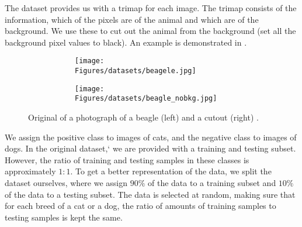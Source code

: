 The dataset provides us with a trimap for each image. The trimap consists of the information, which of the pixels are of the animal and which are of the background. We use these to cut out the animal from the background (set all the background pixel values to black). An example is demonstrated in .
\begin{figure}[!ht]
    \centering
    \begin{subfigure}{0.55\textwidth}
        \begin{subfigure}[t]{0.40\textwidth}
            \texttt{[image: Figures/datasets/beagele.jpg]}
            \label{fig:original:example}
        \end{subfigure}\hfill
        \begin{subfigure}[t]{0.40\textwidth}
            \texttt{[image: Figures/datasets/beagle\_nobkg.jpg]}
            \label{fig:pet:example}
        \end{subfigure}
    \end{subfigure}
    \caption[Original of a photograph of a beagle (left) and a cutout (right)]{Original of a photograph of a beagle (left) and a cutout (right) \cite{parkhi12a}.}
    \label{fig:iiit_pet_cutout}
\end{figure}

We assign the positive class to images of cats, and the negative class to images of dogs. In the original dataset,` we are provided with a training and testing subset. However, the ratio of training and testing samples in these classes is approximately $1:1$. To get a better representation of the data, we split the dataset ourselves, where we assign $90\%$ of the data to a training subset and $10\%$ of the data to a testing subset. The data is selected at random, making sure that for each breed of a cat or a dog, the ratio of amounts of training samples to testing samples is kept the same.
